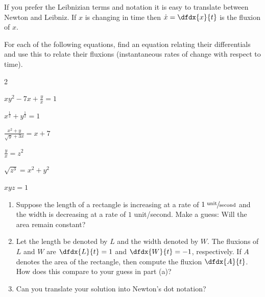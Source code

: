 If you prefer the Leibnizian terms and notation it is easy to
translate between Newton and Leibniz. If $x$ is changing in time then
$\dot{x}=\dfdx{x}{t}$ is the fluxion of $x$.


\begin{ProficiencyDrill}{}
  For each of the following equations, find an equation relating their
  differentials and use this to relate their fluxions (instantaneous
  rates of change with respect to time).
  \begin{enumerate}[label={\bf{}(\alph*)}]{}
    \begin{multicols}{2}
    \item $\displaystyle xy^2-7x+\frac{y}{x}=1$
    \item $\displaystyle x^{\frac12}+y^{\frac12}=1$
    \item $\displaystyle \frac{x^2+y}{\sqrt{y}+3x}=x+7$
    \item $\displaystyle \frac{y}{x}=z^2$
    \item $\displaystyle \sqrt{z^3}=x^2+y^2$
    \item $\displaystyle xyz=1$
    \end{multicols}
  \end{enumerate}
\end{ProficiencyDrill}

\begin{embeddedproblem-enumerate}
  \begin{enumerate}[label={\bf{}(\alph*)}]
  \item Suppose the length of a rectangle is increasing at a rate of
    $1 \sfrac{\text{ unit}}{\text{second}}$ and the width is decreasing
      at a rate of $1$ unit/second.  Make a guess: Will the area
      remain constant?
  \item Let the length be denoted by $L$ and the width denoted by
    $W$. The fluxions of $L$ and $W$ are $\dfdx{L}{t}=1$ and
    $\dfdx{W}{t}=-1$, respectively.  If $A$ denotes the area of the
    rectangle, then compute the fluxion $\dfdx{A}{t}$.  How does
    this compare to your guess in part (a)?
  \item Can you translate your solution into Newton's dot notation?
  \end{enumerate}
\end{embeddedproblem-enumerate}

\pagebreak[4]

